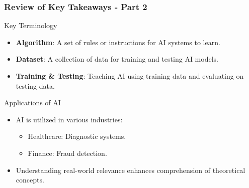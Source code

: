\documentclass[aspectratio=169]{beamer}
\begin{document}
\begin{frame}[fragile]
    \frametitle{Review of Key Takeaways - Part 2}
    \begin{block}{Key Terminology}
        \begin{itemize}
            \item \textbf{Algorithm}: A set of rules or instructions for AI systems to learn.
            \item \textbf{Dataset}: A collection of data for training and testing AI models.
            \item \textbf{Training \& Testing}: Teaching AI using training data and evaluating on testing data.
        \end{itemize}
    \end{block}

    \begin{block}{Applications of AI}
        \begin{itemize}
            \item AI is utilized in various industries:
                \begin{itemize}
                    \item Healthcare: Diagnostic systems.
                    \item Finance: Fraud detection.
                \end{itemize}
            \item Understanding real-world relevance enhances comprehension of theoretical concepts.
        \end{itemize}
    \end{block}
\end{frame}
\end{document}
